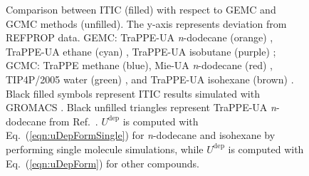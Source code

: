 \documentclass[5p,times]{elsarticle}
\begin{document}
\begin{figure}[]
\caption{Comparison between ITIC (filled) with respect to GEMC and GCMC methods (unfilled). The y-axis represents deviation from REFPROP data. 
GEMC: TraPPE-UA \textit{n}-dodecane  (orange) \cite{Martin1998}, TraPPE-UA ethane (cyan) \cite{Martin1998}, TraPPE-UA isobutane (purple) \cite{Wick2000};
GCMC: TraPPE methane\cite{Shen2008} (blue), Mie-UA \textit{n}-dodecane (red) \cite{Potoff2009}, TIP4P/2005 water (green) \cite{Shen2008}, and TraPPE-UA isohexane (brown) \cite{Mick2017}. Black filled symbols represent ITIC results simulated with GROMACS \cite{Lindahl2001}. Black unfilled triangles represent TraPPE-UA \textit{n}-dodecane from Ref.~\cite{Ungerer2000}. $U^\mathrm{dep}$ is computed with Eq.~(\ref{eqn:uDepFormSingle}) for \textit{n}-dodecane and isohexane by performing single molecule simulations, while $U^\mathrm{dep}$ is computed with Eq.~(\ref{eqn:uDepForm}) for other compounds.
}
\label{fig:EXAMPLE-SIM/Deviation-Psat-rhoL-rhoV}
\end{figure}
\end{document}
